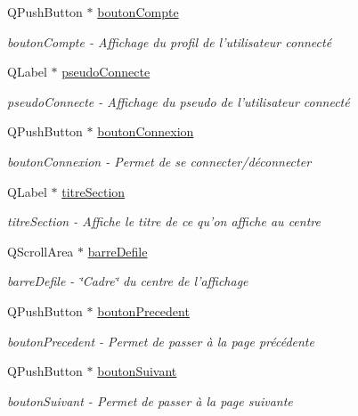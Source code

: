 \begin{DoxyCompactItemize}
Q\-Push\-Button $\ast$ \hyperlink{class_ma_fenetre_abfdb548dc88cf56eae01fd20be7b052a}{bouton\-Compte}
\begin{DoxyCompactList}\small\item\em bouton\-Compte -\/ Affichage du profil de l'utilisateur connecté \end{DoxyCompactList}\item 
Q\-Label $\ast$ \hyperlink{class_ma_fenetre_ae7932944c172401e793af721335e7c3d}{pseudo\-Connecte}
\begin{DoxyCompactList}\small\item\em pseudo\-Connecte -\/ Affichage du pseudo de l'utilisateur connecté \end{DoxyCompactList}\item 
Q\-Push\-Button $\ast$ \hyperlink{class_ma_fenetre_a6654bb6885a843d1a6ad9399eb7d0c36}{bouton\-Connexion}
\begin{DoxyCompactList}\small\item\em bouton\-Connexion -\/ Permet de se connecter/déconnecter \end{DoxyCompactList}\item 
Q\-Label $\ast$ \hyperlink{class_ma_fenetre_ac4749f9608f7c8d6e5d60434ddbedfc5}{titre\-Section}
\begin{DoxyCompactList}\small\item\em titre\-Section -\/ Affiche le titre de ce qu'on affiche au centre \end{DoxyCompactList}\item 
Q\-Scroll\-Area $\ast$ \hyperlink{class_ma_fenetre_a4f199f65ae682c48c837875a486d2f3f}{barre\-Defile}
\begin{DoxyCompactList}\small\item\em barre\-Defile -\/ \char`\"{}\-Cadre\char`\"{} du centre de l'affichage \end{DoxyCompactList}\item 
Q\-Push\-Button $\ast$ \hyperlink{class_ma_fenetre_a53b01801ba121b8240df4f1f8c9330b3}{bouton\-Precedent}
\begin{DoxyCompactList}\small\item\em bouton\-Precedent -\/ Permet de passer à la page précédente \end{DoxyCompactList}\item 
Q\-Push\-Button $\ast$ \hyperlink{class_ma_fenetre_a54110f455a71febc15224b68470dd80e}{bouton\-Suivant}
\begin{DoxyCompactList}\small\item\em bouton\-Suivant -\/ Permet de passer à la page suivante \end{DoxyCompactList}\item 

\end{DoxyCompactItemize}
